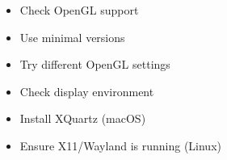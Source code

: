 \documentclass[a4paper,10pt,english,openany,oneside]{sphinxmanual}
\begin{document}
\begin{description}
\begin{itemize}
\end{itemize}

\begin{itemize}
\item {} 
\sphinxAtStartPar
Check OpenGL support

\item {} 
\sphinxAtStartPar
Use minimal versions

\item {} 
\sphinxAtStartPar
Try different OpenGL settings

\end{itemize}

\begin{itemize}
\item {} 
\sphinxAtStartPar
Check display environment

\item {} 
\sphinxAtStartPar
Install XQuartz (macOS)

\item {} 
\sphinxAtStartPar
Ensure X11/Wayland is running (Linux)

\end{itemize}

\end{description}
\end{document}
